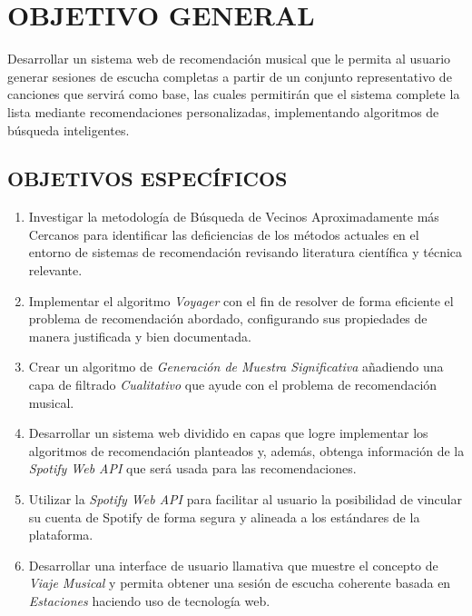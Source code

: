 \newpage
\thispagestyle{plain}
\vspace*{0.1cm}

\section*{OBJETIVO GENERAL}


Desarrollar un sistema web de recomendación musical  que le permita al usuario generar sesiones de escucha completas a partir de un conjunto representativo de canciones que servirá como base, las cuales permitirán que el sistema complete la lista mediante recomendaciones personalizadas, implementando algoritmos de búsqueda inteligentes.


\subsection*{OBJETIVOS ESPECÍFICOS}

\begin{enumerate}
    \item Investigar la metodología de Búsqueda de Vecinos Aproximadamente más Cercanos para identificar las deficiencias de los métodos actuales en el entorno de sistemas de recomendación revisando literatura científica y técnica relevante.
    
     \item Implementar el algoritmo \textit{Voyager} con el fin de resolver de forma eficiente el problema de recomendación abordado, configurando sus propiedades de manera justificada y bien documentada.

    \item Crear un algoritmo de \textit{Generación de Muestra Significativa} añadiendo una capa de filtrado \textit{Cualitativo} que ayude con el problema de recomendación musical. 
    
    \item Desarrollar un sistema web dividido en capas que logre implementar los algoritmos de recomendación planteados y, además, obtenga información de la \textit{Spotify Web API} que será usada para las recomendaciones. 
    
    \item Utilizar la \textit{Spotify Web API} para facilitar al usuario la posibilidad de vincular su cuenta de Spotify de forma segura y alineada a los estándares de la plataforma.
    
    \item Desarrollar una interface de usuario llamativa que muestre el concepto de \textit{Viaje Musical} y permita obtener una sesión de escucha coherente basada en \textit{Estaciones} haciendo uso de tecnología web.

\end{enumerate}